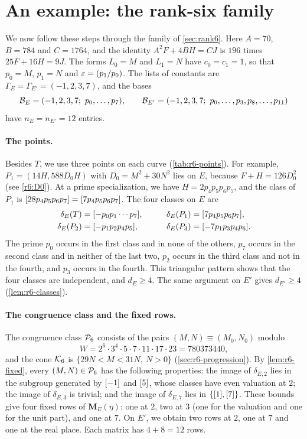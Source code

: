 \section{An example: the rank-six family}\label{sec:overview-example}

We now follow these steps through the family of \cref{sec:rank6}. Here $A=70$, $B=784$ and $C=1764$, and the identity $A^2F+4BH=CJ$ is $196$ times $25F+16H=9J$. The forms $L_0=M$ and $L_1=N$ have $c_0=c_1=1$, so that $p_0=M$, $p_1=N$ and $\eps=\leg{p_1}{p_0}$. The lists of constants are $\Gamma_E=\Gamma_{E'}=(-1,2,3,7)$, and the bases
\begin{equation*}
\cB_E=(-1,2,3,7;\ p_0,\dots,p_7),\qquad\cB_{E'}=(-1,2,3,7;\ p_0,\dots,p_3,p_8,\dots,p_{11})
\end{equation*}
have $n_E=n_{E'}=12$ entries.

\paragraph{The points.} Besides $T$, we use three points on each curve (\cref{tab:r6-points}). For example, $P_1=(14H,588D_0H)$ with $D_0=M^2+30N^2$ lies on $E$, because $F+H=126D_0^2$ (see \eqref{r6:D0}). At a prime specialization, we have $H=2p_4p_5p_6p_7$, and the class of $P_1$ is $[28p_4p_5p_6p_7]=[7p_4p_5p_6p_7]$. The four classes on $E$ are
\begin{equation*}
\begin{aligned}
\delta_E(T)&=[-p_0p_1\cdots p_7],&\qquad\delta_E(P_1)&=[7p_4p_5p_6p_7],\\
\delta_E(P_2)&=[-p_1p_2p_4p_5],&\qquad\delta_E(P_3)&=[-7p_1p_3p_4p_6].
\end{aligned}
\end{equation*}
The prime $p_0$ occurs in the first class and in none of the others, $p_7$ occurs in the second class and in neither of the last two, $p_2$ occurs in the third class and not in the fourth, and $p_3$ occurs in the fourth. This triangular pattern shows that the four classes are independent, and $d_E\ge4$. The same argument on $E'$ gives $d_{E'}\ge4$ (\cref{lem:r6-classes}).

\paragraph{The congruence class and the fixed rows.} The congruence class $\mathcal P_6$ consists of the pairs $(M,N)\equiv(M_0,N_0)$ modulo
\begin{equation*}
W=2^6\cdot3^4\cdot5\cdot7\cdot11\cdot17\cdot23=780373440,
\end{equation*}
and the cone $\mathcal K_6$ is $\{29N<M<31N,\ N>0\}$ (\cref{sec:r6-progression}). By \cref{lem:r6-fixed}, every $(M,N)\in\mathcal P_6$ has the following properties: the image of $\delta_{E,2}$ lies in the subgroup generated by $[-1]$ and $[5]$, whose classes have even valuation at $2$; the image of $\delta_{E,3}$ is trivial; and the image of $\delta_{E,7}$ lies in $\{[1],[7]\}$. These bounds give four fixed rows of $\mathbf M_E(\eta)$: one at $2$, two at $3$ (one for the valuation and one for the unit part), and one at $7$. On $E'$, we obtain two rows at $2$, one at $7$ and one at the real place. Each matrix has $4+8=12$ rows.

